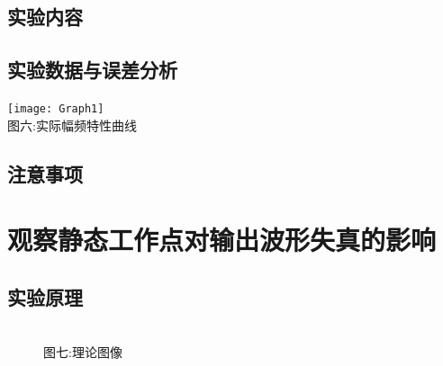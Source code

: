 \documentclass[a4paper]{article}
\begin{document}
    \subsection{实验内容}\label{subsec:14}

    \subsection{实验数据与误差分析}\label{subsec:15}
    \begin{center}
        \texttt{[image: Graph1]}\\
        {\small 图六:实际幅频特性曲线}
    \end{center}

    \subsection{注意事项}\label{subsec:16}


    \section{观察静态工作点对输出波形失真的影响}\label{sec:7}

    \subsection{实验原理}\label{subsec:17}
    \begin{figure}[htb]
        \centering
        \\
        {\small 图七:理论图像}
    \end{figure}
\end{document}
